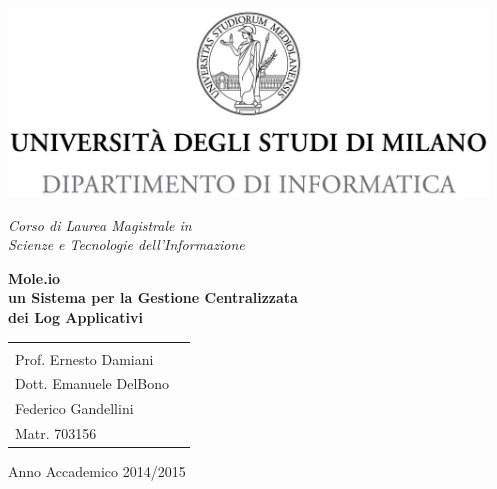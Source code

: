 \begin{titlepage}
  \begin{center}
    \includegraphics[height=5.0cm]{img/minerva_2013_DI.jpg}
    
    \vspace*{.4cm}
    {\Large 
      \emph{Corso di Laurea Magistrale in\\[.3cm]
        Scienze e Tecnologie dell'Informazione}
    }
    \vfill
    \begin{LARGE}
      \textbf{Mole.io\\[0.4cm]
        un Sistema per la Gestione Centralizzata\\[0.6cm]
        dei Log Applicativi}
    \end{LARGE}
    
    \vfill
    \begin{minipage}{.99\linewidth}
      \begin{tabular}{l r}
        \begin{minipage}{.4\linewidth}
          \begin{flushleft}
            {\large
              RELATORE\\[.3cm]
              Prof. Ernesto Damiani
            }
            
            \vspace*{1.5cm}
            {\large
              CORRELATORE\\[.3cm]
              Dott. Emanuele DelBono
            }
          \end{flushleft}
        \end{minipage}
        &
        \begin{minipage}{.6\linewidth}
          \begin{flushright}
            {\large
              TESI DI LAUREA DI\\[.3cm]
              Federico Gandellini\\[.45cm]
              Matr. 703156
            }
          \end{flushright}
        \end{minipage}
      \end{tabular}
    \end{minipage}
    
    \vfill
    {\large{{Anno Accademico 2014/2015}}}
  \end{center}
\end{titlepage}
